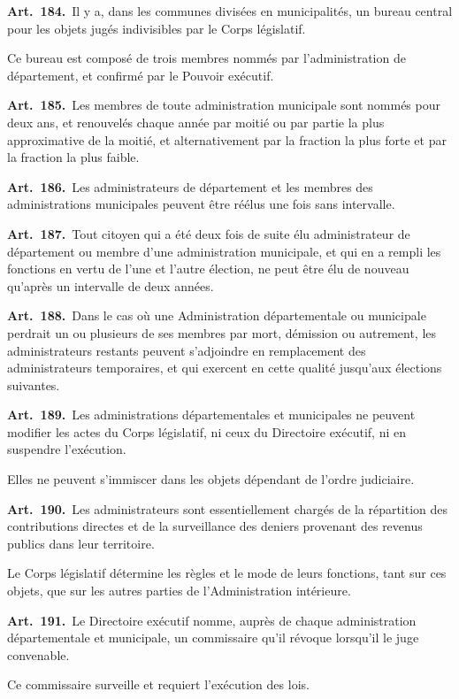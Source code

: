 \documentclass[french,twoside]{book} %
\newcommand{\labelchar}[1]{\textbf{\color{rubric} #1}}
\begin{document}
\labelchar{Art. 184.} Il y a, dans les communes divisées en municipalités, un bureau central pour les objets jugés indivisibles par le Corps législatif.\par
Ce bureau est composé de trois membres nommés par l’administration de département, et confirmé par le Pouvoir exécutif.\par
\labelchar{Art. 185.} Les membres de toute administration municipale sont nommés pour deux ans, et renouvelés chaque année par moitié ou par partie la plus approximative de la moitié, et alternativement par la fraction la plus forte et par la fraction la plus faible.\par
\labelchar{Art. 186.} Les administrateurs de département et les membres des administrations municipales peuvent être réélus une fois sans intervalle.\par
\labelchar{Art. 187.} Tout citoyen qui a été deux fois de suite élu administrateur de département ou membre d’une administration municipale, et qui en a rempli les fonctions en vertu de l’une et l’autre élection, ne peut être élu de nouveau qu’après un intervalle de deux années.\par
\labelchar{Art. 188.} Dans le cas où une Administration départementale ou municipale perdrait un ou plusieurs de ses membres par mort, démission ou autrement, les administrateurs restants peuvent s’adjoindre en remplacement des administrateurs temporaires, et qui exercent en cette qualité jusqu’aux élections suivantes.\par
\labelchar{Art. 189.} Les administrations départementales et municipales ne peuvent modifier les actes du Corps législatif, ni ceux du Directoire exécutif, ni en suspendre l’exécution.\par
Elles ne peuvent s’immiscer dans les objets dépendant de l’ordre judiciaire.\par
\labelchar{Art. 190.} Les administrateurs sont essentiellement chargés de la répartition des contributions directes et de la surveillance des deniers provenant des revenus publics dans leur territoire.\par
Le Corps législatif détermine les règles et le mode de leurs fonctions, tant sur ces objets, que sur les autres parties de l’Administration intérieure.\par
\labelchar{Art. 191.} Le Directoire exécutif nomme, auprès de chaque administration départementale et municipale, un commissaire qu’il révoque lorsqu’il le juge convenable.\par
Ce commissaire surveille et requiert l’exécution des lois.\par
\end{document}
